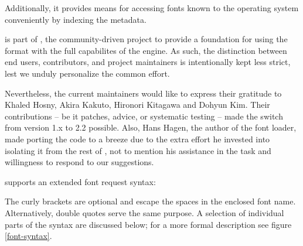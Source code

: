 Additionally, it provides means for accessing fonts known to the operating
system conveniently by indexing the metadata.

\endsection


 is part of \LUALATEX, the community-driven
project to provide a foundation for using the \LATEX format with the
full capabilites of the \LUATEX engine.
%
As such, the distinction between end users, contributors, and project
maintainers is intentionally kept less strict, lest we unduly
personalize the common effort.

Nevertheless, the current maintainers would like to express their
gratitude to Khaled Hosny, Akira Kakuto, Hironori Kitagawa and Dohyun
Kim.
%
Their contributions -- be it patches, advice, or systematic
testing -- made the switch from version 1.x to 2.2 possible.
%
Also, Hans Hagen, the author of the font loader, made porting the
code to \LATEX a breeze due to the extra effort he invested into
isolating it from the rest of \CONTEXT, not to mention his assistance
in the task and willingness to respond to our suggestions.

\endsection


 supports an extended font request syntax:

\beginnarrower
\endnarrower

\noindent
The curly brackets are optional and escape the spaces in the enclosed
font name.
%
Alternatively, double quotes serve the same purpose.
%
A selection of individual parts of the syntax are discussed below;
for a more formal description see figure \ref{font-syntax}.

